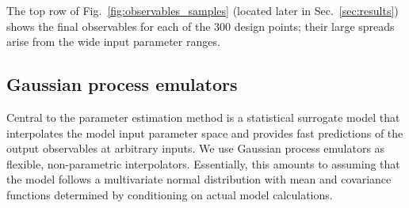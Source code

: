 \documentclass[aps,prc,reprint,amsmath,nofootinbib,superscriptaddress]{revtex4-1}
\begin{document}
The top row of Fig.~\ref{fig:observables_samples} (located later in Sec.~\ref{sec:results}) shows the final observables for each of the 300 design points;
their large spreads arise from the wide input parameter ranges.

\subsection{Gaussian process emulators}

\newcommand{\x}{\mathbf x}
\newcommand{\y}{\mathbf y}
\newcommand{\N}{\mathcal N}
\newcommand{\muvec}{\boldsymbol\mu}
\newcommand{\tran}{^\intercal}

Central to the parameter estimation method is a statistical surrogate model that interpolates the model input parameter space and provides fast predictions of the output observables at arbitrary inputs.
We use Gaussian process emulators \cite{Rasmussen:2006gp} as flexible, non-parametric interpolators.
Essentially, this amounts to assuming that the model follows a multivariate normal distribution with mean and covariance functions determined by conditioning on actual model calculations.
\end{document}
